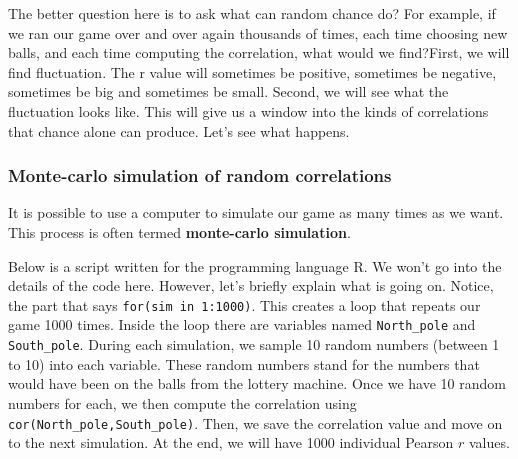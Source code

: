 \documentclass[
]{book}
\begin{document}
The better question here is to ask what can random chance do? For example, if we ran our game over and over again thousands of times, each time choosing new balls, and each time computing the correlation, what would we find?First, we will find fluctuation. The r value will sometimes be positive, sometimes be negative, sometimes be big and sometimes be small. Second, we will see what the fluctuation looks like. This will give us a window into the kinds of correlations that chance alone can produce. Let's see what happens.

\subsubsection{Monte-carlo simulation of random correlations}\label{monte-carlo-simulation-of-random-correlations}

It is possible to use a computer to simulate our game as many times as we want. This process is often termed \textbf{monte-carlo simulation}.

Below is a script written for the programming language R. We won't go into the details of the code here. However, let's briefly explain what is going on. Notice, the part that says \texttt{for(sim\ in\ 1:1000)}. This creates a loop that repeats our game 1000 times. Inside the loop there are variables named \texttt{North\_pole} and \texttt{South\_pole}. During each simulation, we sample 10 random numbers (between 1 to 10) into each variable. These random numbers stand for the numbers that would have been on the balls from the lottery machine. Once we have 10 random numbers for each, we then compute the correlation using \texttt{cor(North\_pole,South\_pole)}. Then, we save the correlation value and move on to the next simulation. At the end, we will have 1000 individual Pearson \(r\) values.
\end{document}
